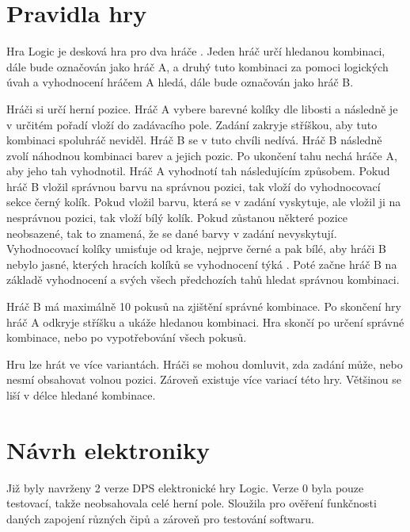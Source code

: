 \chapter{Pravidla hry}
Hra Logic je desková hra pro dva hráče \cite{Logic_pravidla}. Jeden hráč určí hledanou kombinaci, dále bude označován jako 
hráč A, a druhý tuto kombinaci za pomoci logických úvah a vyhodnocení hráčem A hledá, dále bude označován jako hráč B.

Hráči si určí herní pozice. Hráč A vybere barevné kolíky dle libosti a následně je v určitém pořadí vloží do zadávacího pole. Zadání zakryje stříškou, aby tuto
kombinaci spoluhráč neviděl. Hráč B se v tuto chvíli nedívá. Hráč B následně zvolí náhodnou kombinaci barev a jejich pozic. Po 
ukončení tahu nechá
hráče A, aby jeho tah vyhodnotil. Hráč A vyhodnotí tah následujícím způsobem. Pokud hráč B vložil správnou barvu na správnou pozici, tak vloží 
do vyhodnocovací sekce černý kolík. Pokud vložil barvu, která se v zadání vyskytuje, ale vložil ji na nesprávnou pozici, tak vloží bílý kolík.
Pokud zůstanou některé pozice neobsazené, tak to znamená, že se dané barvy v zadání nevyskytují. 
Vyhodnocovací kolíky umisťuje od kraje, nejprve černé a pak bílé, aby hráči B nebylo jasné, kterých hracích kolíků se vyhodnocení týká \cite{Logic_pravidla}.
Poté začne hráč B na základě vyhodnocení a svých všech předchozích tahů hledat správnou kombinaci.

Hráč B má maximálně 10 pokusů na zjištění správné kombinace. Po skončení hry hráč A odkryje stříšku a ukáže hledanou kombinaci. Hra skončí po určení správné 
kombinace, nebo po vypotřebování všech pokusů.

Hru lze hrát ve více variantách. Hráči se mohou domluvit, zda zadání může, nebo nesmí obsahovat volnou pozici. Zároveň existuje 
více variací této hry. Většinou se liší v délce hledané kombinace.


\chapter{Návrh elektroniky}

Již byly navrženy 2 verze DPS elektronické hry Logic. Verze 0 byla pouze testovací, takže neobsahovala celé herní pole. 
Sloužila pro ověření funkčnosti daných zapojení různých čipů a zároveň pro testování softwaru.

